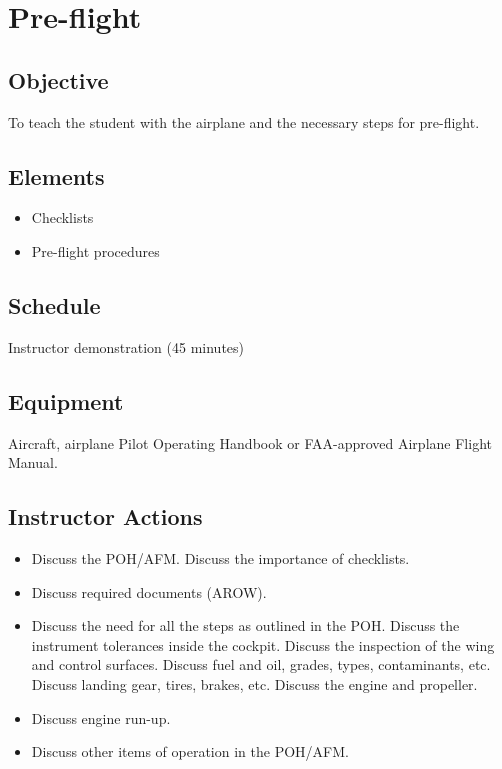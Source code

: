 \section{Pre-flight}

\subsection{Objective}

To teach the student with the airplane and the necessary steps for pre-flight.

\subsection{Elements}

\begin{itemize}
  \item Checklists
  \item Pre-flight procedures
\end{itemize}

\subsection{Schedule}

Instructor demonstration (45 minutes)

\subsection{Equipment}

Aircraft, airplane Pilot Operating Handbook or FAA-approved Airplane Flight
Manual.

\subsection{Instructor Actions}

\begin{itemize}
  \item Discuss the POH/AFM. Discuss the importance of checklists.

  \item Discuss required documents (AROW).

  \item Discuss the need for all the steps as outlined in the POH. Discuss the
    instrument tolerances inside the cockpit. Discuss the inspection of the
    wing and control surfaces. Discuss fuel and oil, grades, types,
    contaminants, etc. Discuss landing gear, tires, brakes, etc. Discuss the
    engine and propeller.

  \item Discuss engine run-up.

  \item Discuss other items of operation in the POH/AFM.
\end{itemize}

